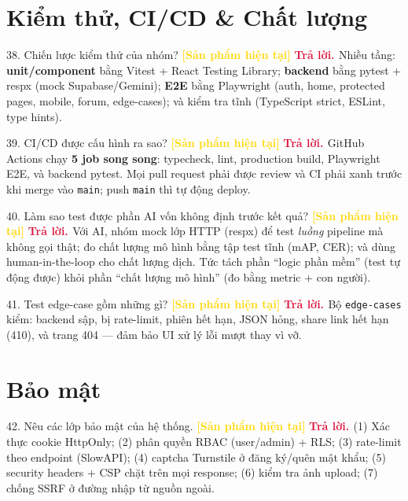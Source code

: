 \documentclass[11pt]{article}
\newcommand{\tagSP}{\textcolor{gold}{\footnotesize\textbf{[Sản phẩm hiện tại]}}}
\newcommand{\A}{\textbf{\textcolor{crimson}{Trả lời. }}}
\begin{document}
\section{Kiểm thử, CI/CD \& Chất lượng}

\begin{qa}{38. Chiến lược kiểm thử của nhóm? \tagSP}
\A Nhiều tầng: \textbf{unit/component} bằng Vitest + React Testing Library; \textbf{backend} bằng pytest + respx (mock Supabase/Gemini); \textbf{E2E} bằng Playwright (auth, home, protected pages, mobile, forum, edge-cases); và kiểm tra tĩnh (TypeScript strict, ESLint, type hints).
\end{qa}

\begin{qa}{39. CI/CD được cấu hình ra sao? \tagSP}
\A GitHub Actions chạy \textbf{5 job song song}: typecheck, lint, production build, Playwright E2E, và backend pytest. Mọi pull request phải được review và CI phải xanh trước khi merge vào \texttt{main}; push \texttt{main} thì tự động deploy.
\end{qa}

\begin{qa}{40. Làm sao test được phần AI vốn không định trước kết quả? \tagSP}
\A Với AI, nhóm mock lớp HTTP (respx) để test \textit{luồng} pipeline mà không gọi thật; đo chất lượng mô hình bằng tập test tĩnh (mAP, CER); và dùng human-in-the-loop cho chất lượng dịch. Tức tách phần ``logic phần mềm'' (test tự động được) khỏi phần ``chất lượng mô hình'' (đo bằng metric + con người).
\end{qa}

\begin{qa}{41. Test edge-case gồm những gì? \tagSP}
\A Bộ \texttt{edge-cases} kiểm: backend sập, bị rate-limit, phiên hết hạn, JSON hỏng, share link hết hạn (410), và trang 404 --- đảm bảo UI xử lý lỗi mượt thay vì vỡ.
\end{qa}

\section{Bảo mật}

\begin{qa}{42. Nêu các lớp bảo mật của hệ thống. \tagSP}
\A (1) Xác thực cookie HttpOnly; (2) phân quyền RBAC (user/admin) + RLS; (3) rate-limit theo endpoint (SlowAPI); (4) captcha Turnstile ở đăng ký/quên mật khẩu; (5) security headers + CSP chặt trên mọi response; (6) kiểm tra ảnh upload; (7) chống SSRF ở đường nhập từ nguồn ngoài.
\end{qa}
\end{document}
